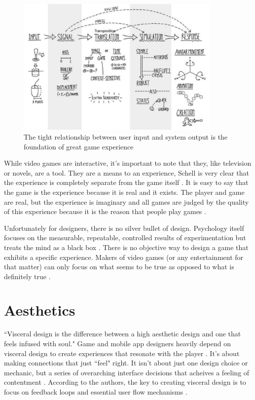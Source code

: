 \begin{figure}
\centering
\includegraphics[width=100mm]{images/relationships.pdf}
\caption{The tight relationship between user input and system output is the foundation of great game experience}
\label{fig:relationships}
\end{figure}

While video games are interactive, it's important to note that they, like television or novels, are a tool. They are a means to an experience, Schell is very clear that the experience is completely separate from the game itself \cite{schell2008art}. It is easy to say that the game is the experience because it is real and it exists. The player and game are real, but the experience is imaginary and all games are judged by the quality of this experience because it is the reason that people play games \cite{schell2008art}.

Unfortunately for designers, there is no silver bullet of design. Psychology itself focuses on the measurable, repeatable, controlled results of experimentation but treats the mind as a black box \cite{schell2008art}. There is no objective way to design a game that exhibits a specific experience. Makers of video games (or any entertainment for that matter) can only focus on what seems to be true as opposed to what is definitely true \cite{schell2008art}.

\section{Aesthetics}

``Visceral design is the difference between a high aesthetic design and one that feels infused with soul." \cite{brown2013how} Game and mobile app designers heavily depend on visceral design to create experiences that resonate with the player \cite{brown2013how}. It's about making connections that just ``feel" right. It isn't about just one design choice or mechanic, but a series of overarching interface decisions that acheives a feeling of contentment \cite{brown2013how}. According to the authors, the key to creating visceral design is to focus on feedback loops and essential user flow mechanisms \cite{brown2013how}.

